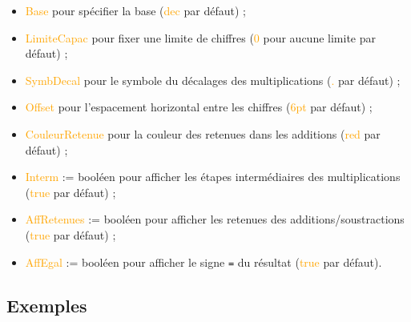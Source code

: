 \documentclass[french,a4paper,11pt]{article}
\newcommand\Cle[1]{{\small\sffamily\textlangle \textcolor{orange}{#1}\textrangle}}
\begin{document}
{{\begin{cautionblock}
\begin{itemize}
	\item \Cle{Base} pour spécifier la base (\Cle{dec} par défaut) ;
	\item \Cle{LimiteCapac} pour fixer une limite de chiffres (\Cle{0} pour aucune limite par défaut) ;
	\item \Cle{SymbDecal} pour le symbole du décalages des multiplications (\Cle{.} par défaut) ;
	\item \Cle{Offset} pour l'espacement horizontal entre les chiffres (\Cle{6pt} par défaut) ;
	\item \Cle{CouleurRetenue} pour la couleur des retenues dans les additions (\Cle{red} par défaut) ;
	\item \Cle{Interm} := booléen pour afficher les étapes intermédiaires des multiplications (\Cle{true} par défaut) ;
	\item \Cle{AffRetenues} := booléen pour afficher les retenues des additions/soustractions (\Cle{true} par défaut) ;
	\item \Cle{AffEgal} := booléen pour afficher le signe \texttt{=} du résultat (\Cle{true} par défaut).
\end{itemize}
\end{cautionblock}

\subsection{Exemples}

\begin{DemoCode}[]
\end{DemoCode}

\begin{DemoCode}[]

\end{DemoCode}

\begin{DemoCode}[]
\end{DemoCode}

\begin{DemoCode}[]
{\Huge\ttfamily
{}}
\end{DemoCode}

\begin{DemoCode}[]
\end{DemoCode}

}}
\end{document}
